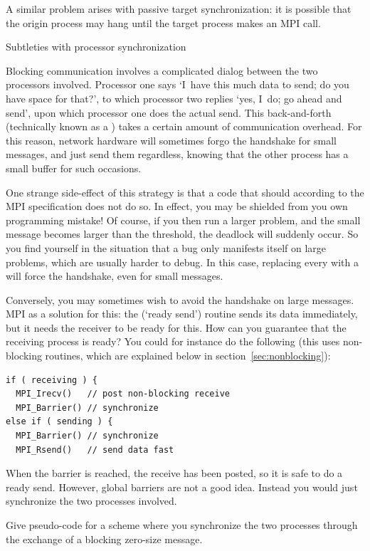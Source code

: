 A similar problem arises with passive target synchronization:
it is possible that the origin process may hang until 
the target process makes an MPI call.


 {Subtleties with processor synchronization}
\label{sec:handshake}

Blocking communication involves a complicated dialog between the two
processors involved. Processor one says `I~have this much data to
send; do you have space for that?', to which processor two replies
`yes, I~do; go ahead and send', upon which processor one does the
actual send. This back-and-forth (technically known as
a ) takes a certain amount of communication
overhead. For this reason, network hardware will sometimes forgo the
handshake for small messages, and just send them regardless, knowing
that the other process has a small buffer for such occasions.


One strange side-effect of this strategy is that a code that
should  according to the MPI specification does
not do so. In effect, you may be shielded from you own programming
mistake! Of course, if you then run a larger problem, and the small
message becomes larger than the threshold, the deadlock will suddenly
occur. So you find yourself in the situation that a bug only manifests
itself on large problems, which are usually harder to debug. In this
case, replacing every  with a  will force the
handshake, even for small messages.

Conversely, you may sometimes wish to avoid the handshake on large
messages. MPI as a solution for this: the  (`ready
send') routine sends its data immediately, but it needs the receiver
to be ready for this. How can you guarantee that the receiving process
is ready? You could for instance do the following (this uses
non-blocking routines, which are explained below in
section~\ref{sec:nonblocking}):
\begin{lstlisting}
if ( receiving ) {
  MPI_Irecv()   // post non-blocking receive
  MPI_Barrier() // synchronize
else if ( sending ) {
  MPI_Barrier() // synchronize
  MPI_Rsend()   // send data fast
\end{lstlisting}
When the barrier is reached, the receive has been posted, so it is safe 
to do a ready send. However, global barriers are not a good idea.
Instead you would just synchronize the two processes involved.
\begin{exercise}
  Give pseudo-code for a scheme where you synchronize the two
  processes through the exchange of a blocking zero-size message.
\end{exercise}

